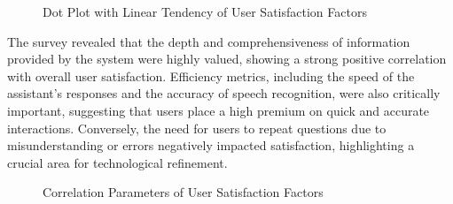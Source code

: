 \documentclass[12pt]{article}
\begin{document}
\begin{figure}[bht]
\centering
{}
\vspace{-5mm}
\caption{Dot Plot with Linear Tendency of User Satisfaction Factors}
\label{dotplot}
\end{figure}
The survey revealed that the depth and comprehensiveness of information provided by the system were highly valued, showing a strong positive correlation with overall user satisfaction. Efficiency metrics, including the speed of the assistant’s responses and the accuracy of speech recognition, were also critically important, suggesting that users place a high premium on quick and accurate interactions. Conversely, the need for users to repeat questions due to misunderstanding or errors negatively impacted satisfaction, highlighting a crucial area for technological refinement.

\begin{figure}[bht]
\centering
{}
\vspace{-5mm}
\caption{Correlation Parameters of User Satisfaction Factors}
\label{factorchart}
\end{figure}
\end{document}
